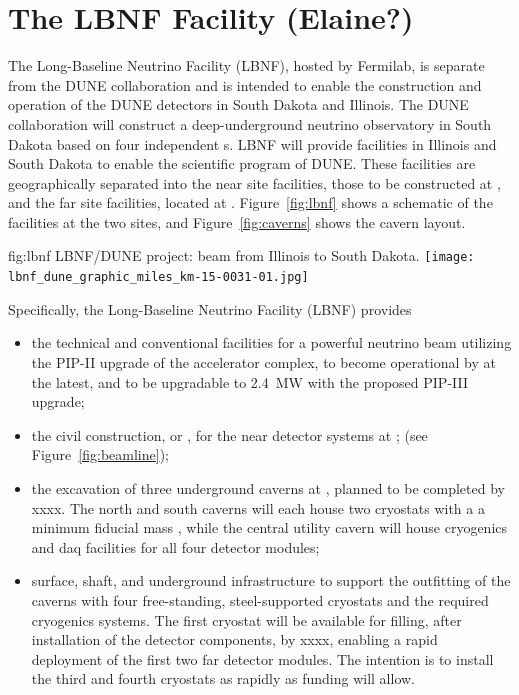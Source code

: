 \section{The LBNF Facility (Elaine?)} 

The Long-Baseline Neutrino
Facility (LBNF), hosted by Fermilab, is separate from the DUNE collaboration and is intended to enable the construction and operation of the DUNE detectors in South Dakota and Illinois.
The DUNE collaboration will construct a deep-underground neutrino observatory in South Dakota based on four independent \nominalmodsize \lartpc{}s. %
LBNF will provide facilities in Illinois and South Dakota to enable the scientific program of DUNE.
These facilities are geographically separated into the near site facilities, those to be constructed
at \fnal, and the far site facilities, located at \surf. Figure~\ref{fig:lbnf} shows
a schematic of the facilities at the two sites, and Figure~\ref{fig:caverns} shows the cavern layout. 

\begin{dunefigure}{fig:lbnf}{ 	
LBNF/DUNE project: beam from Illinois to South Dakota.}
\texttt{[image: lbnf\_dune\_graphic\_miles\_km-15-0031-01.jpg]}
\end{dunefigure}

Specifically, the Long-Baseline Neutrino Facility (LBNF) provides
\begin{itemize}

\item  the  technical and conventional facilities for a powerful  neutrino beam utilizing the PIP-II upgrade of the \fnal accelerator 
complex, to become operational by \beamturnon  
at the latest, and to be upgradable to \SI{2.4}{\MW} with the proposed 
PIP-III upgrade;

\item  the civil construction, or , for the near detector systems at \fnal; (see Figure~\ref{fig:beamline}); 

\item the excavation of three underground caverns at \surf, planned to be completed by xxxx. The north and south caverns will each house two cryostats with a
a minimum \nominalmodsize fiducial mass \lartpc, while the central utility cavern will house cryogenics and daq facilities for all four detector modules;



\item surface, shaft, and underground infrastructure to support 
the outfitting of the caverns with four free-standing, steel-supported cryostats 
and the required cryogenics systems. The first cryostat will be available for filling, after installation of the detector components, by
xxxx, enabling a rapid deployment of the first two \nominalmodsize far detector modules. 
The intention is to install the third and fourth cryostats as rapidly as funding will 
allow.

\end{itemize}


